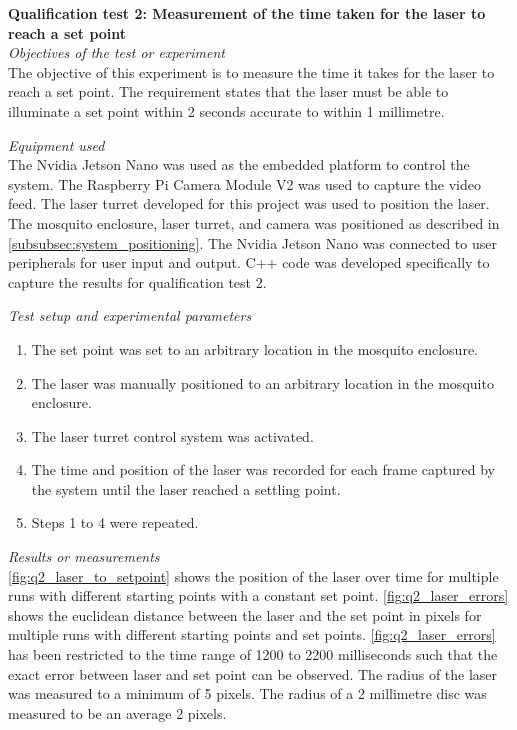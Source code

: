 \FloatBarrier
\textbf{Qualification test 2: Measurement of the time taken for the laser to reach a set point}\\

\textit{Objectives of the test or experiment}\\
The objective of this experiment is to measure the time it takes for the laser to reach a set point. The requirement states that the laser must be able to illuminate a set point within 2 seconds accurate to within 1 millimetre.

\textit{Equipment used}\\
The Nvidia Jetson Nano was used as the embedded platform to control the system. The Raspberry Pi Camera Module V2 was used to capture the video feed. The laser turret developed for this project was used to position the laser. The mosquito enclosure, laser turret, and camera was positioned as described in \autoref{subsubsec:system_positioning}. The Nvidia Jetson Nano was connected to user peripherals for user input and output. C++ code was developed specifically to capture the results for qualification test 2.

\textit{Test setup and experimental parameters}
\begin{enumerate}
  \item The set point was set to an arbitrary location in the mosquito enclosure.
  \item The laser was manually positioned to an arbitrary location in the mosquito enclosure.
  \item The laser turret control system was activated.
  \item The time and position of the laser was recorded for each frame captured by the system until the laser reached a settling point.
  \item Steps 1 to 4 were repeated.
\end{enumerate}

\textit{Results or measurements}\\
\autoref{fig:q2_laser_to_setpoint} shows the position of the laser over time for multiple runs with different starting points with a constant set point. \autoref{fig:q2_laser_errors} shows the euclidean distance between the laser and the set point in pixels for multiple runs with different starting points and set points. \autoref{fig:q2_laser_errors} has been restricted to the time range of 1200 to 2200 milliseconds such that the exact error between laser and set point can be observed. The radius of the laser was measured to a minimum of 5 pixels. The radius of a 2 millimetre disc was measured to be an average 2 pixels.

